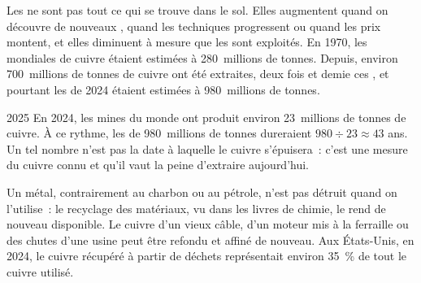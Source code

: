 Les  ne sont pas tout ce qui se trouve dans le sol. Elles
augmentent quand on découvre de nouveaux , quand les techniques
progressent ou quand les prix montent, et elles diminuent à mesure que les
 sont exploités. En 1970, les  mondiales de cuivre étaient
estimées à 280~millions de tonnes. Depuis, environ 700~millions de tonnes
de cuivre ont été extraites, deux fois et demie ces , et pourtant
les  de 2024 étaient estimées à 980~millions de tonnes.

\begin{dated}{2025}
En 2024, les mines du monde ont produit environ 23~millions de tonnes de
cuivre. À ce rythme, les  de 980~millions de tonnes dureraient $980 \div 23
\approx 43$ ans. Un tel nombre n'est pas la date à laquelle le cuivre
s'épuisera~: c'est une mesure du cuivre connu et qu'il vaut la peine
d'extraire aujourd'hui.
\end{dated}

Un métal, contrairement au charbon ou au pétrole, n'est pas détruit quand
on l'utilise~: le recyclage des matériaux, vu dans les livres de chimie,
le rend de nouveau disponible. Le cuivre d'un vieux câble, d'un moteur mis
à la ferraille ou des chutes d'une usine peut être refondu et affiné de
nouveau. Aux États-Unis, en 2024, le cuivre récupéré à partir de déchets
représentait environ \qty{35}{\%} de tout le cuivre utilisé.


